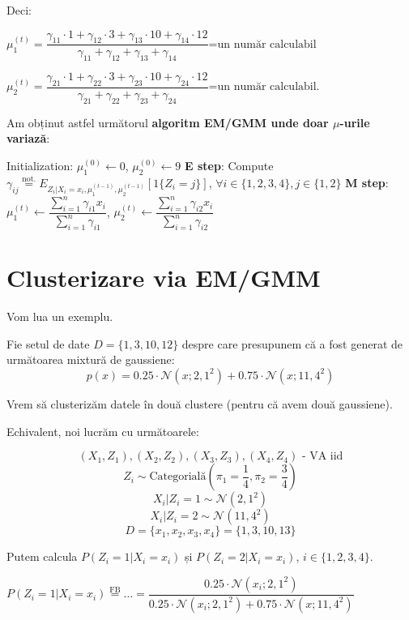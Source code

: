 \documentclass[12pt]{article}
\begin{document}
\begin{enumerate}
		Deci:
		
		$\mu_1^{(t)} = \dfrac{\gamma_{11}\cdot 1 + \gamma_{12}\cdot 3 + \gamma_{13}\cdot 10+ \gamma_{14}\cdot 12}{\gamma_{11}+ \gamma_{12}+ \gamma_{13}+ \gamma_{14}}\text{=un număr calculabil}$
		
		$\mu_2^{(t)} = \dfrac{\gamma_{21}\cdot 1 + \gamma_{22}\cdot 3 + \gamma_{23}\cdot 10+ \gamma_{24}\cdot 12}{\gamma_{21}+ \gamma_{22}+ \gamma_{23}+ \gamma_{24}}\text{=un număr calculabil}$.
		
	Am obținut astfel următorul \textbf{algoritm EM/GMM unde doar $\mu$-urile variază}:
		
	\begin{algorithmic}
		\STATE Initialization: $\mu_1^{(0)}\gets 0$, $\mu_2^{(0)}\gets 9$
		\STATE \textbf{E step}: Compute $\gamma_{ij} \stackrel{\text{not.}}{=} E_{Z_i|X_i=x_i,\mu_1^{(t-1)},\mu_2^{(t-1)} }[1\{Z_i=j\}]$, $\forall i \in \{1,2,3,4\}, j\in \{1,2\}$
		\STATE \textbf{M step}: $\mu_1^{(t)} \gets \dfrac{\sum_{i=1}^{n} \gamma_{i1} x_i}{\sum_{i=1}^{n} \gamma_{i1}}$, $\mu_2^{(t)} \gets \dfrac{\sum_{i=1}^{n} \gamma_{i2} x_i}{\sum_{i=1}^{n} \gamma_{i2}}$
		\ENDFOR
	\end{algorithmic}	
	\end{enumerate}
	
	\section{Clusterizare via EM/GMM}
	
	Vom lua un exemplu.
	
	Fie setul de date $D = \{1, 3, 10, 12\}$ despre care presupunem că a fost generat de următoarea mixtură de gaussiene:
	$$p(x) = 0.25\cdot \mathcal{N}(x;2,1^2) + 0.75\cdot\mathcal{N}(x;11,4^2)$$
	
	Vrem să clusterizăm datele în două clustere (pentru că avem două gaussiene). 
	
	Echivalent, noi lucrăm cu următoarele:
	
	$$(X_1,Z_1),(X_2,Z_2),(X_3,Z_3),(X_4,Z_4)\text{ - VA iid}$$
	$$Z_i \sim \text{Categorială}(\pi_1=\frac{1}{4},\pi_2=\frac{3}{4})$$
	$$X_i|Z_i = 1 \sim \mathcal{N}(2,1^2)$$
	$$X_i|Z_i = 2 \sim \mathcal{N}(11,4^2)$$
	$$D = \{x_1,x_2,x_3,x_4\} = \{1,3,10,13\}$$
	
	Putem calcula $P(Z_i = 1|X_i = x_i)$ și $P(Z_i = 2|X_i = x_i)$, $i \in \{1,2,3,4\}$. 
	
	$P(Z_i = 1|X_i = x_i) \stackrel{\text{FB}}{=} \dots = \dfrac{0.25\cdot \mathcal{N}(x_i;2,1^2)}{0.25\cdot \mathcal{N}(x_i;2,1^2) + 0.75\cdot\mathcal{N}(x;11,4^2)}$
	
\end{document}
